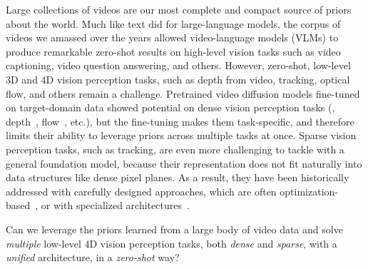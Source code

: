 
Large collections of videos are our most complete and compact source of priors about the world.
Much like text did for large-language models, the corpus of videos we amassed over the years allowed video-language models (VLMs) to produce remarkable zero-shot results on high-level vision tasks such as video captioning, video question answering, and others.
However, zero-shot, low-level 3D and 4D vision perception tasks, such as depth from video, tracking, optical flow, and others remain a challenge.
Pretrained video diffusion models fine-tuned on target-domain data showed potential on dense vision perception tasks (\eg, depth~\cite{ke2024repurposing,hu2024depthcrafter}, flow~\cite{saxena2024surprising}, etc.), but the fine-tuning makes them task-specific, and therefore limits their ability to leverage priors across multiple tasks at once.
Sparse vision perception tasks, such as tracking, are even more challenging to tackle with a general foundation model, because their representation does not fit naturally into data structures like dense pixel planes.
As a result, they have been historically addressed with carefully designed approaches, which are often optimization-based~\cite{wang2023omnimotion}, or with specialized architectures~\cite{karaev2023cotracker,doersch2023tapir}.

Can we leverage the priors learned from a large body of video data and solve \emph{multiple} low-level 4D vision perception tasks, both \emph{dense} and \emph{sparse}, with a \emph{unified} architecture, in a \emph{zero-shot} way?

